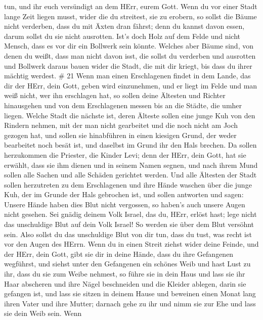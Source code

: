 tun, und ihr euch versündigt an dem HErr, eurem Gott.  Wenn
du vor einer Stadt lange Zeit liegen musst, wider die du streitest, sie
zu erobern, so sollst die Bäume nicht verderben, dass du mit Äxten dran
fährst; denn du kannst davon essen, darum sollst du sie nicht ausrotten.
Ist's doch Holz auf dem Felde und nicht Mensch, dass es vor dir ein
Bollwerk sein könnte.  Welches aber Bäume sind, von denen
du weißt, dass man nicht davon isst, die sollst du verderben und
ausrotten und Bollwerk daraus bauen wider die Stadt, die mit dir kriegt,
bis dass du ihrer mächtig werdest. \# 21  Wenn man einen
Erschlagenen findet in dem Lande, das dir der HErr, dein Gott, geben
wird einzunehmen, und er liegt im Felde und man weiß nicht, wer ihn
erschlagen hat,  so sollen deine Ältesten und Richter
hinausgehen und von dem Erschlagenen messen bis an die Städte, die umher
liegen.  Welche Stadt die nächste ist, deren Älteste sollen
eine junge Kuh von den Rindern nehmen, mit der man nicht gearbeitet und
die noch nicht am Joch gezogen hat,  und sollen sie
hinabführen in einen kiesigen Grund, der weder bearbeitet noch besät
ist, und daselbst im Grund ihr den Hals brechen.  Da sollen
herzukommen die Priester, die Kinder Levi; denn der HErr, dein Gott, hat
sie erwählt, dass sie ihm dienen und in seinem Namen segnen, und nach
ihrem Mund sollen alle Sachen und alle Schäden gerichtet werden.
 Und alle Ältesten der Stadt sollen herzutreten zu dem
Erschlagenen und ihre Hände waschen über die junge Kuh, der im Grunde
der Hals gebrochen ist,  und sollen antworten und sagen:
Unsere Hände haben dies Blut nicht vergossen, so haben's auch unsere
Augen nicht gesehen.  Sei gnädig deinem Volk Israel, das du,
HErr, erlöst hast; lege nicht das unschuldige Blut auf dein Volk Israel!
So werden sie über dem Blut versöhnt sein.  Also sollst du
das unschuldige Blut von dir tun, dass du tust, was recht ist vor den
Augen des HErrn.  Wenn du in einen Streit ziehst wider
deine Feinde, und der HErr, dein Gott, gibt sie dir in deine Hände, dass
du ihre Gefangenen wegführst,  und siehst unter den
Gefangenen ein schönes Weib und hast Lust zu ihr, dass du sie zum Weibe
nehmest,  so führe sie in dein Haus und lass sie ihr Haar
abscheren und ihre Nägel beschneiden  und die Kleider
ablegen, darin sie gefangen ist, und lass sie sitzen in deinem Hause und
beweinen einen Monat lang ihren Vater und ihre Mutter; darnach gehe zu
ihr und nimm sie zur Ehe und lass sie dein Weib sein.  Wenn
